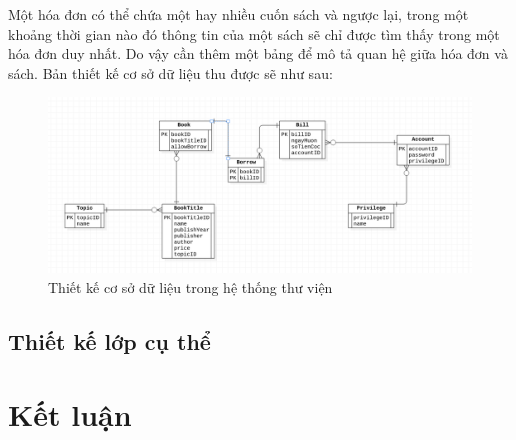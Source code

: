 \documentclass[12pt]{report}
\begin{document}
Một hóa đơn có thể chứa một hay nhiều cuốn sách và ngược lại, trong một khoảng 
thời gian nào đó thông tin của một sách sẽ chỉ được tìm thấy trong một hóa đơn duy nhất. 
Do vậy cần thêm một bảng để mô tả quan hệ giữa hóa đơn và sách.
 Bản thiết kế cơ sở dữ liệu thu được sẽ như sau:
\begin{figure}[H]
\centering
\includegraphics[width=\textwidth]{figures/db.png}
\caption{Thiết kế cơ sở dữ liệu trong hệ thống thư viện}
\end{figure}

\subsection{Thiết kế lớp cụ thể}

\section{Kết luận}
\end{document}

